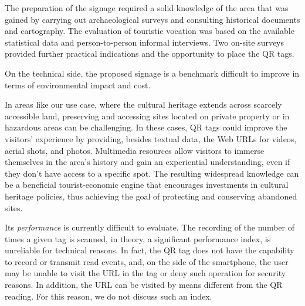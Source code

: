 \documentclass[sustainability,article,submit,pdftex,moreauthors]{Definitions/mdpi}
\begin{document}
The preparation of the signage required a solid knowledge of the area that was gained by carrying out archaeological surveys and consulting historical documents and cartography. The evaluation of touristic vocation was based on the available statistical data and person-to-person informal interviews. Two on-site surveys provided further practical indications and the opportunity to place the QR tags.

On the technical side, the proposed signage is a benchmark difficult to improve in terms of environmental impact and cost.


In areas like our use case, where the cultural heritage extends across scarcely accessible land, preserving and accessing sites located on private property or in hazardous areas can be challenging. In these cases, QR tags could improve the visitors' experience by providing, besides textual data, the Web URLs for videos, aerial shots, and photos. Multimedia resources allow visitors to immerse themselves in the area's history and gain an experiential understanding, even if they don't have access to a specific spot. The resulting widespread knowledge can be a beneficial tourist-economic engine that encourages investments in cultural heritage policies, thus achieving the goal of protecting and conserving abandoned sites.

Its {\em performance} is currently difficult to evaluate. The recording of the number of times a given tag is scanned, in theory, a significant performance index, is unreliable for technical reasons. In fact, the QR tag does not have the capability to record or transmit read events, and, on the side of the smartphone, the user may be unable to visit the URL in the tag or deny such operation for security reasons. In addition, the URL can be visited by means different from the QR reading. For this reason, we do not discuss such an index.
\end{document}
